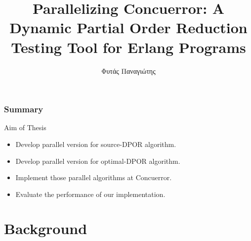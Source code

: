 \documentclass[9pt]{beamer}
\title[Short title]{Parallelizing Concuerror: A Dynamic Partial Order Reduction Testing Tool for Erlang Programs} %
\author{Φυτάς Παναγιώτης} %
\institute[NTUA] %
{
ΣΗΜΜΥ - ΕΜΠ \\ %
\medskip
\textit{03112113} %
}
\date{} %
\begin{document}
\begin{frame}
\titlepage %
\end{frame}

\begin{frame}
\frametitle{Summary} %
\tableofcontents %
\end{frame}




\begin{frame}{Aim of Thesis}

\begin{itemize}[<+->]
    \item Develop parallel version for source-DPOR algorithm.
    \item Develop parallel version for optimal-DPOR algorithm.
    \item Implement those parallel algorithms at Concuerror.
    \item Evaluate the performance of our implementation.
\end{itemize}

\end{frame}

\section{Background}
\end{document}
